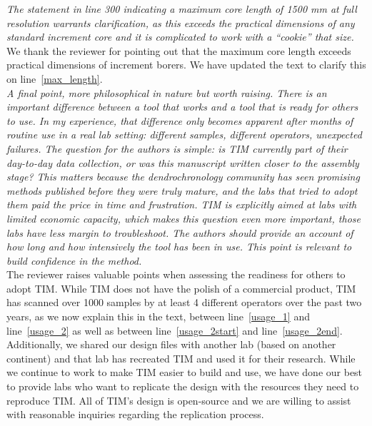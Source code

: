 \documentclass[12pt,a4paper]{article}
\newcommand{\lr}[1]{line~\ref{#1}}
\begin{document}
\emph{The statement in line 300 indicating a maximum core length of 1500 mm at full resolution warrants clarification, as this exceeds the practical dimensions of any standard increment core and it is complicated to work with a “cookie” that size.}\\

We thank the reviewer for pointing out that the maximum core length exceeds practical dimensions of increment borers. We have updated the text to clarify this on \lr{max_length}.\\ 

\emph{A final point, more philosophical in nature but worth raising. There is an important difference between a tool that works and a tool that is ready for others to use. In my experience, that difference only becomes apparent after months of routine use in a real lab setting: different samples, different operators, unexpected failures. The question for the authors is simple: is TIM currently part of their day-to-day data collection, or was this manuscript written closer to the assembly stage? This matters because the dendrochronology community has seen promising methods published before they were truly mature, and the labs that tried to adopt them paid the price in time and frustration. TIM is explicitly aimed at labs with limited economic capacity, which makes this question even more important, those labs have less margin to troubleshoot. The authors should provide an account of how long and how intensively the tool has been in use. This point is relevant to build confidence in the method.}\\

The reviewer raises valuable points when assessing the readiness for others to adopt TIM. While TIM does not have the polish of a commercial product, TIM has scanned over 1000 samples by at least 4 different operators over the past two years, as we now explain this in the text, between \lr{usage_1} and \lr{usage_2} as well as between \lr{usage_2start} and \lr{usage_2end}.\\ 

Additionally, we shared our design files with another lab (based on another continent) and that lab has recreated TIM and used it for their research. While we continue to work to make TIM easier to build and use, we have done our best to provide labs who want to replicate the design with the resources they need to reproduce TIM. All of TIM's design is open-source and we are willing to assist with reasonable inquiries regarding the replication process.  \\
\end{document}

